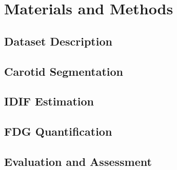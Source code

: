 \chapter{Materials and Methods}

\section{Dataset Description}
\lipsum[1-1]
\section{Carotid Segmentation}
\lipsum[1-3]
\section{IDIF Estimation}


\lipsum[1-3]
\section{FDG Quantification}
\lipsum[1-3]
\section{Evaluation and Assessment}
\lipsum[1-1]
